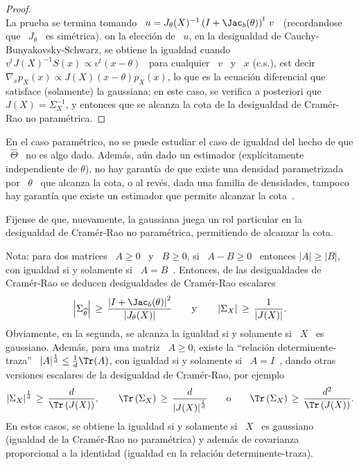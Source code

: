 \begin{proof}
\[  \]
  La prueba se termina tomando \ $u = J_\theta(X)^{-1} \left( I + \Jac_b(\theta)
  \right)^t \,  v$ \ (recordandose  que \ $J_\theta$ \  es sim\'etrica).\newline
  on la
  elecci\'on  de \  $u$,  en la  desigualdad  de Cauchy-Bunyakovsky-Schwarz,  se
  obtiene la igualdad  cuando \ $v^t J(X)^{-1} S(x) \propto v^t  (x - \theta)$ \
  para cualquier \ $v$  \ y \ $x$ (c.s.), est decir  \ $\nabla_x p_X (x) \propto
  J(X) (x -  \theta) p_X(x)$, lo que es la  ecuaci\'on diferencial que satisface
  (solamente) la gaussiana: en este caso, se verifica a posteriori que \ $J(X) =
  \Sigma_X^{-1}$,  y  entonces que  se  alcanza la  cota  de  la desigualdad  de
  Cram\'er-Rao no param\'etrica.
\end{proof}
%
\noindent En el caso param\'etrico, no se puede estudiar el caso de igualdad del
hecho de  que \ $\widehat{\Theta}$ \ no  es algo dado.  Adem\'as,  a\'un dado un
estimador (expl\'icitamente independiente de $\theta$), no hay garant\'ia de que
existe una  densidad parametrizada por  \ $\theta$ \  que alcanza la cota,  o al
rev\'es, dada  una familia de densidades,  tampoco hay garant\'ia  que existe un
estimador que permite alcanzar la cota~\cite{CovTho06, Kay93, Bos07}.

Fijense  de  que,  nuevamente,  la  gaussiana  juega un  rol  particular  en  la
desigualdad de Cram\'er-Rao no param\'etrica, permitiendo de alcanzar la cota.

Nota: para  dos matrices \  $A \ge 0$  \ y \  $B \ge 0$,  si \ $A  - B \ge  0$ \
entonces $|A| \ge  |B|$, con igualdad si y solamente si  \ $A = B$~\cite[cap.~1,
teorema~25]{MagNeu99}.   Entonces,  de  las  desigualdades  de  Cram\'er-Rao  se
deducen desigualdades de Cram\'er-Rao escalares
%
\[
\left|   \Sigma_{\widehat{\theta}}  \right|   \,   \ge  \,   \frac{\left|  I   +
    \Jac_b(\theta) \right|^2}{\left| J_\theta(X) \right|} \qquad \mbox{y} \qquad
\left| \Sigma_X \right| \, \ge \, \frac{1}{\left| J(X) \right|}.
\]
%
Obviamente, en la segunda,  se alcanza la igualdad si y solamente  si \ $X$ \ es
gaussiano.   Adem\'as, para  una  matriz \  $A  \ge 0$,  existe la  ``relaci\'on
determinente-traza''  \ $|A|^{\frac1d} \le  \frac1d \Tr(A)$,  con igualdad  si y
solamente si  \ $A = I$~\cite[cap.~11, sec.~4]{MagNeu99},  dando otras versiones
escalares de la desigualdad de Cram\'er-Rao, por ejemplo\modif{, de la versi\'on
  no param\'etrica,}
%
\[
\left| \Sigma_X  \right|^{\frac1d} \,  \ge \, \frac{d}{\Tr\left(  J(X) \right)},
\qquad   \Tr\left(   \Sigma_X   \right)   \,   \ge   \,   \frac{d}{\left|   J(X)
  \right|^{\frac1d}} \qquad \mbox{o} \qquad \Tr\left( \Sigma_X \right) \, \ge \,
\frac{d^2}{\Tr\left( J(X) \right)}.
\]
%
En estos casos,  se obtiene la igualdad si  y solamente si \ $X$  \ es gaussiano
(igualdad  de  la  Cram\'er-Rao  no  param\'etrica)  y  adem\'as  de  covarianza
proporcional a la identidad (igualdad en la relaci\'on determinente-traza).

